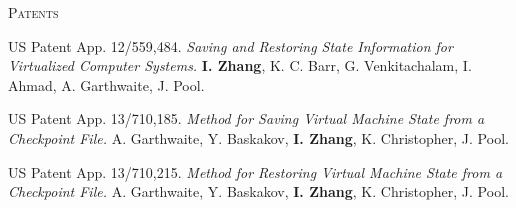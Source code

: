 \documentclass[10pt,times]{report}
\newlength{\sectiongap}
\newlength{\sectioncolwidth}
\newlength{\colgap}
\newlength{\stuffwidth}
\newenvironment{rtable}{
  \begin{minipage}{\textwidth}
  }{
  \end{minipage}
}
\newenvironment{rsection}[1]{
  \begin{minipage}[t]{\sectioncolwidth}
    \textsc{#1}
  \end{minipage}
  \hspace{\colgap}
  \begin{minipage}[t]{\stuffwidth}
  }{
    \removelastskip
  \end{minipage}
  \\[\sectiongap]
}
\begin{document}
\begin{rtable}
  \begin{rsection}{Patents}
    US Patent App. 12/559,484.
    \textit{Saving and Restoring State Information for Virtualized
      Computer Systems.} 
    \textbf{I. Zhang}, K. C. Barr, G. Venkitachalam, I. Ahmad, A. Garthwaite, J. Pool.\\\vspace{-0.5em}

    US Patent App. 13/710,185. 
    \textit{Method for Saving Virtual Machine State from a Checkpoint
    File.}  A. Garthwaite, Y. Baskakov, \textbf{I. Zhang}, K. Christopher,
    J. Pool.\\\vspace{-0.5em}

    US Patent App. 13/710,215. \textit{Method for Restoring Virtual Machine State from a Checkpoint
    File.} A. Garthwaite, Y. Baskakov, \textbf{I. Zhang}, K. Christopher,
    J. Pool.\\\vspace{-0.5em}
    

\end{rsection}
\end{rtable}
\end{document}
